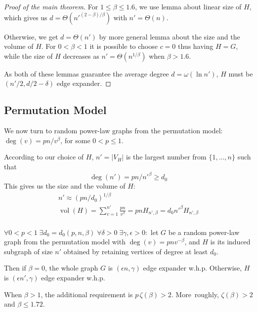 \documentclass{beamer}
\DeclareMathOperator*{\vol}{vol}
\newcommand{\autotitle}{\secname\ifdefempty{\subsecname}{}{~--- \subsecname}}
\begin{document}
\begin{frame}{\autotitle}
    \begin{proof}[Proof of the main theorem]
        For $1\leq\beta\leq 1.6$, we use lemma about linear size of $H$,
        which gives us $d=\Theta\left(n'^{(2-\beta)/\beta}\right)$ with $n'=\Theta(n)$.

        Otherwise, we get $d=\Theta(n')$ by more general lemma
        about the size and the volume of $H$.
        For $0<\beta<1$ it is possible to choose $c=0$ thus having $H=G$,
        while the size of $H$ decreases as $n'=\Theta(n^{1/\beta})$ when $\beta>1.6$.
        
        As both of these lemmas guarantee the average degree $d=\omega(\ln n')$,
        $H$ must be $(n'/2,d/2-\delta)$ edge expander.
    \end{proof}
\end{frame}

\subsection{Permutation Model}

\begin{frame}{\autotitle}
    We now turn to random power-law graphs from the permutation model:
    $\deg(v)=pn/v^\beta$, for some $0<p\leq 1$.

    According to our choice of $H$, $n'=|V_H|$ is
    the largest number from $\{1,\ldots,n\}$ such that
    \begin{equation*}
        \deg(n')=pn/n'^\beta\geq d_0
    \end{equation*}
    This gives us the size and the volume of $H$:
    \begin{gather*}
        n'\approx(pn/d_0)^{1/\beta}\\
        \vol(H)=\sum_{v=1}^{n'}{\frac{pn}{v^\beta}}=pnH_{n',\beta}=d_0n'^\beta H_{n',\beta}\\
    \end{gather*}
\end{frame}

\begin{frame}{\autotitle}
    \begin{theorem}
        $\forall 0<p<1\;\exists d_0=d_0(p,n,\beta)\;\forall\delta>0\;\exists\gamma,\epsilon>0:$
        let $G$ be a random power-law graph from the permutation model with $\deg(v)=pnv^{-\beta}$,
        and $H$ is its induced subgraph of size $n'$ obtained by retaining vertices of degree at least $d_0$.
        
        Then if $\beta=0$, the whole graph $G$ is $(\epsilon n,\gamma)$ edge expander w.h.p.
        Otherwise, $H$ is $(\epsilon n',\gamma)$ edge expander w.h.p.
        
        When $\beta>1$, the additional requirement is $p\,\zeta(\beta)>2$.
        More~roughly, $\zeta(\beta)>2$ and $\beta\leq 1.72$.
    \end{theorem}
\end{frame}
\end{document}
